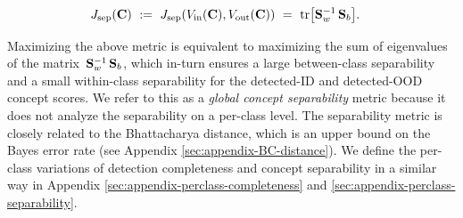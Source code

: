 \begin{align}
\label{eq:separability_trace}
&J_{\textrm{sep}}(\bfC) ~:=~ J_{\textrm{sep}}(V_{\textrm{in}}(\bfC), V_{\textrm{out}}(\bfC)) ~=~ \textrm{tr}\big[\bfS_w^{-1} \,\bfS_b\big].
%
%
\end{align}

\fi
%
Maximizing the above metric is equivalent to maximizing the sum of eigenvalues of the matrix $\,\mathbf{S}_w^{-1} \,\mathbf{S}_b$, which in-turn ensures a large between-class separability and a small within-class separability for the detected-ID and detected-OOD concept scores.
We refer to this as a {\em global concept separability} metric because it does not analyze the separability on a per-class level.
The separability metric is closely related to the Bhattacharya distance, which is an upper bound on the Bayes error rate (see Appendix \ref{sec:appendix-BC-distance}).
We define the per-class variations of detection completeness and concept separability in a similar way in Appendix \ref{sec:appendix-perclass-completeness} and \ref{sec:appendix-perclass-separability}. 

